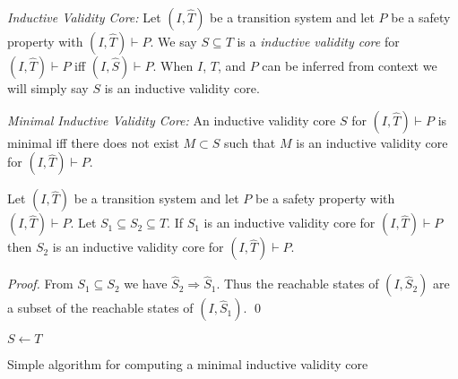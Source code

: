 

\begin{definition}{\emph{Inductive Validity Core:}}
  \label{def:ivc}
  Let $(I, \widehat T)$ be a transition system and let $P$ be a
  safety property with $(I, \widehat T)\vdash P$. We say $S \subseteq
  T$ is a {\em inductive validity core} for $(I, \widehat T)\vdash P$ iff $(I,
  \widehat S) \vdash P$. When $I$, $T$, and $P$ can be inferred from
  context we will simply say $S$ is an inductive validity core.
\end{definition}

\begin{definition}{\emph{Minimal Inductive Validity Core:}}
  \label{def:minimal-set-of-support}
  An inductive validity core $S$ for $(I, \widehat T)\vdash P$ is minimal iff
  there does not exist $M \subset S$ such that $M$ is an inductive validity core
  for $(I, \widehat T)\vdash P$.
\end{definition}

\begin{lemma}
  \label{lem:set-of-support-monotonic}
  Let $(I, \widehat T)$ be a transition system and let $P$ be a
  safety property with $(I, \widehat T)\vdash P$. Let $S_1 \subseteq
  S_2 \subseteq T$. If $S_1$ is an inductive validity core for $(I, \widehat
  T)\vdash P$ then $S_2$ is an inductive validity core for $(I, \widehat T)\vdash P$.
\end{lemma}
\begin{proof}
  From $S_1 \subseteq S_2$ we have $\widehat S_2 \Rightarrow \widehat
  S_1$. Thus the reachable states of $(I, \widehat S_2)$ are a subset
  of the reachable states of $(I, \widehat S_1)$. \qed
\end{proof}

\begin{algorithm}[t]
  \BlankLine
  $S \leftarrow T$ \\
   {
  }
\caption{Simple algorithm for computing a minimal inductive validity core}
\label{alg:naive}
\end{algorithm}

